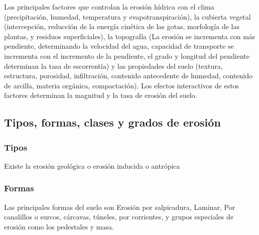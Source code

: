     Los principales factores que controlan la erosión hídrica con el clima (precipitación, humedad, temperatura y evapotranspiración), la cubierta vegetal (intercepción, reducción de la energía cinética de las gotas, morfología de las plantas, y residuos superficiales), la topografía (La erosión se incrementa con más pendiente, determinando la velocidad del agua, capacidad de transporte se incrementa con el incremento de la pendiente, el grado y longitud del pendiente determinan la tasa de escorrentía) y las propiedades del suelo (textura, estructura, porosidad, infiltración, contenido antecedente de humedad, contenido de arcilla, materia orgánica, compactación). Los efectos interactivos de estos factores determinan la magnitud y la tasa de erosión del suelo.
    
    \subsection{Tipos, formas, clases y grados de erosión}
    \subsubsection{Tipos}
    Existe la erosión geológica o erosión inducida o antrópica
    \subsubsection{Formas}
    Las principales formas del suelo son Erosión por salpicadura, Laminar, Por canalillos o surcos, cárcavas, túneles, por corrientes, y grupos especiales de erosión como los pedestales y masa.
    

